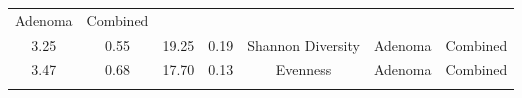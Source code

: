 \documentclass[12pt,]{article}
\begin{document}
\begin{longtable}[]{@{}ccccccc@{}}
\begin{minipage}[t]{0.09\columnwidth}
Adenoma\strut
\end{minipage} & \begin{minipage}[t]{0.11\columnwidth}\centering\strut
Combined\strut
\end{minipage}\tabularnewline
\begin{minipage}[t]{0.09\columnwidth}\centering\strut
3.25\strut
\end{minipage} & \begin{minipage}[t]{0.16\columnwidth}\centering\strut
0.55\strut
\end{minipage} & \begin{minipage}[t]{0.16\columnwidth}\centering\strut
19.25\strut
\end{minipage} & \begin{minipage}[t]{0.07\columnwidth}\centering\strut
0.19\strut
\end{minipage} & \begin{minipage}[t]{0.14\columnwidth}\centering\strut
Shannon Diversity\strut
\end{minipage} & \begin{minipage}[t]{0.09\columnwidth}\centering\strut
Adenoma\strut
\end{minipage} & \begin{minipage}[t]{0.11\columnwidth}\centering\strut
Combined\strut
\end{minipage}\tabularnewline
\begin{minipage}[t]{0.09\columnwidth}\centering\strut
3.47\strut
\end{minipage} & \begin{minipage}[t]{0.16\columnwidth}\centering\strut
0.68\strut
\end{minipage} & \begin{minipage}[t]{0.16\columnwidth}\centering\strut
17.70\strut
\end{minipage} & \begin{minipage}[t]{0.07\columnwidth}\centering\strut
0.13\strut
\end{minipage} & \begin{minipage}[t]{0.14\columnwidth}\centering\strut
Evenness\strut
\end{minipage} & \begin{minipage}[t]{0.09\columnwidth}\centering\strut
Adenoma\strut
\end{minipage} & \begin{minipage}[t]{0.11\columnwidth}\centering\strut
Combined\strut
\end{minipage}\tabularnewline
\begin{minipage}[t]{0.09\columnwidth}\centering\strut

\end{minipage}
\end{longtable}
\end{document}

